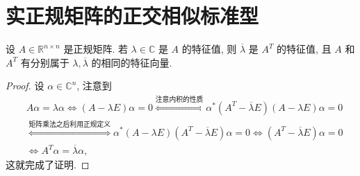 \documentclass[../../main.tex]{subfiles}%
\begin{document}
\section{实正规矩阵的正交相似标准型}

\begin{lemma}\label{lemma:正规矩阵与其转置有相同特征向量}
设 $A \in \mathbb{R}^{n \times n}$ 是正规矩阵. 若 $\lambda \in \mathbb{C}$ 是 $A$ 的特征值, 则 $\overline{\lambda}$ 是 $A^T$ 的特征值, 且 $A$ 和 $A^T$ 有分别属于 $\lambda,\overline{\lambda}$ 的相同的特征向量.
\end{lemma}
\begin{proof}
设 $\alpha \in \mathbb{C}^n$, 注意到
\begin{align*}
&A\alpha = \lambda\alpha \iff (A - \lambda E)\alpha = 0 \stackrel{\text{注意内积的性质}}{\iff} \alpha^*(A^T - \overline{\lambda}E)(A - \lambda E)\alpha = 0 \\
&\stackrel{\text{矩阵乘法之后利用正规定义}}{\iff} \alpha^*(A - \lambda E)(A^T - \overline{\lambda}E)\alpha = 0 \iff (A^T - \overline{\lambda}E)\alpha = 0 
\\
&\iff A^T\alpha = \overline{\lambda}\alpha,
\end{align*}
这就完成了证明.
\end{proof}
\end{document}
